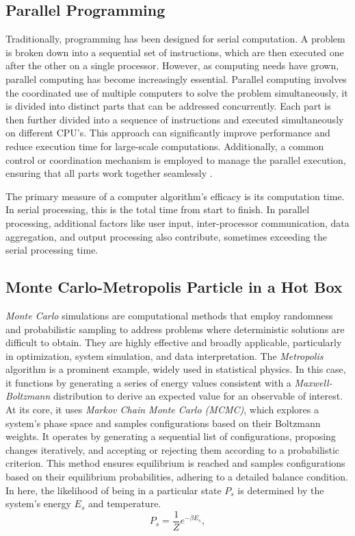 \documentclass[%
 reprint,
 amsmath,amssymb,
 aps,
]{revtex4-2}
\begin{document}
\subsection{Parallel Programming}

Traditionally, programming has been designed for serial computation. A problem is broken down into a sequential set of instructions, which are then executed one after the other on a single processor. However, as computing needs have grown, parallel computing has become increasingly essential. Parallel computing involves the coordinated use of multiple computers to solve the problem simultaneously, it is divided into distinct parts that can be addressed concurrently. Each part is then further divided into a sequence of instructions and executed simultaneously on different CPU's. This approach can significantly improve performance and reduce execution time for large-scale computations. Additionally, a common control or coordination mechanism is employed to manage the parallel execution, ensuring that all parts work together seamlessly \cite{dalcin_mpi_2005}.

The primary measure of a computer algorithm's efficacy is its computation time. In serial processing, this is the total time from start to finish. In parallel processing, additional factors like user input, inter-processor communication, data aggregation, and output processing also contribute, sometimes exceeding the serial processing time.

\subsection{Monte Carlo-Metropolis Particle in a Hot Box}

\textit{Monte Carlo} simulations are computational methods that employ randomness and probabilistic sampling to address problems where deterministic solutions are difficult to obtain. They are highly effective and broadly applicable, particularly in optimization, system simulation, and data interpretation. The \textit{Metropolis} algorithm is a prominent example, widely used in statistical physics. In this case, it functions by generating a series of energy values consistent with a \textit{Maxwell-Boltzmann} distribution to derive an expected value for an observable of interest.
At its core, it uses  \textit{Markov Chain Monte Carlo (MCMC)}, which explores a system's phase space and samples configurations based on their Boltzmann weights. It operates by generating a sequential list of configurations, proposing changes iteratively, and accepting or rejecting them according to a probabilistic criterion. This method ensures equilibrium is reached and samples configurations based on their equilibrium probabilities, adhering to a detailed balance condition. In here, the likelihood of being in a particular state $P_{s}$ is determined by the system's energy $E_{s}$ and temperature.
\begin{equation}
        P_s=\frac{1}{Z} e^{-\beta E_s}, 
\end{equation}
\end{document}
